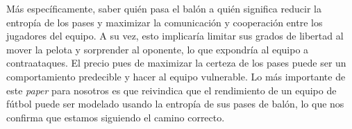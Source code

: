 Más específicamente, saber quién pasa el balón a quién significa reducir la entropía de los pases y maximizar 
la comunicación y cooperación entre los jugadores del equipo. A su vez, esto implicaría limitar sus 
grados de libertad al mover la pelota y sorprender al oponente, lo que expondría al equipo a contraataques. El precio 
pues de maximizar la certeza de los pases puede ser un comportamiento predecible y hacer al equipo vulnerable. Lo más importante 
de este \textit{paper} para nosotros es que reivindica que el rendimiento de un equipo de fútbol puede 
ser modelado usando la entropía de sus pases de balón, lo que nos confirma que estamos siguiendo el camino correcto.

